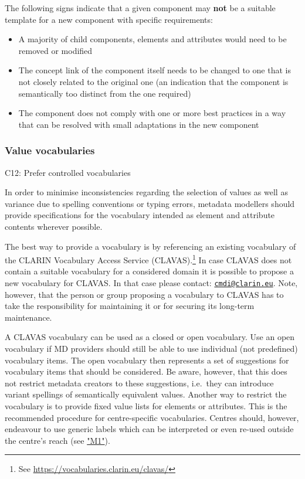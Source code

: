 The following signs indicate that a given component may \textbf{not} be a suitable template for a new component with specific requirements:

\begin{itemize}
\tightlist
\item
  A majority of child components, elements and attributes would need to be removed or modified
\item
  The concept link of the component itself needs to be changed to one that is not closely related to the original one (an indication that the component is semantically too distinct from the one required)
\item
  The component does not comply with one or more best practices in a way that can be resolved with small adaptations in the new component
\end{itemize}

\subsubsection{Value vocabularies}\label{value-vocabularies}

\label{c12}
C12: Prefer controlled vocabularies

 

In order to minimise inconsistencies regarding the selection of values as well as variance due to spelling conventions or typing errors, metadata modellers should provide specifications for the vocabulary intended as element and attribute contents wherever possible.

The best way to provide a vocabulary is by referencing an existing vocabulary of the CLARIN Vocabulary Access Service (CLAVAS).\footnote{See \url{https://vocabularies.clarin.eu/clavas/}} In case CLAVAS does not contain a suitable vocabulary for a considered domain it is possible to propose a new vocabulary for CLAVAS. In that case please contact: \href{mailto:cmdi@clarin.eu}{\nolinkurl{cmdi@clarin.eu}}. Note, however, that the person or group proposing a vocabulary to CLAVAS has to take the responsibility for maintaining it or for securing its long-term maintenance.

A CLAVAS vocabulary can be used as a closed or open vocabulary. Use an open vocabulary if MD providers should still be able to use individual (not predefined) vocabulary items. The open vocabulary then represents a set of suggestions for vocabulary items that should be considered. Be
aware, however, that this does not restrict metadata creators to these suggestions, i.e.~they can introduce variant spellings of semantically equivalent values. Another way to restrict the vocabulary is to provide fixed value lists for elements or attributes. This is the recommended procedure for centre-specific vocabularies. Centres should, however, endeavour to use generic labels which can be interpreted or even re-used outside the centre's reach (see \hyperref[m1]{"M1"}).

